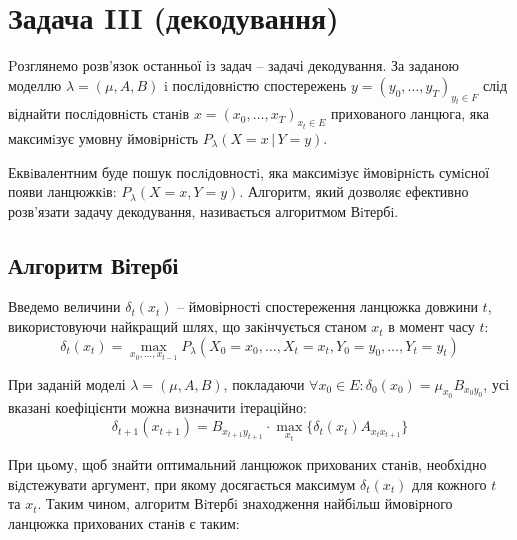 \section{Задача III (декодування)}

Pозглянемо розв'язок останньої із задач -- задачі декодування. За заданою моделлю $\lambda=(\mu,A,B)$ i послiдовнiстю спостережень $y=(y_0, \ldots , y_T)_{y_t\in F}$ слід віднайти послiдовнiсть станiв $x=(x_0, \ldots , x_T)_{x_t\in E}$ прихованого ланцюга, яка максимiзує умовну ймовiрнiсть $P_\lambda(X=x \, |\, Y=y)$.

Еквiвалентним буде пошук послiдовностi, яка максимiзує ймовiрнiсть сумiсної появи ланцюжкiв: $P_\lambda(X=x,Y=y)$. Алгоритм, який дозволяє ефективно розв’я\-зати задачу декодування, називається алгоритмом
Вiтербi.

\subsection{Алгоритм Вітербі}

Введемо величини $\delta_t(x_t)$ -- ймовірності спостереження ланцюжка довжини $t$, використовуючи найкращий шлях, що закiнчується станом $x_t$ в момент часу $t:$
\[ \delta_t(x_t)=\max_{x_0,\ldots,x_{t-1}}P_\lambda(X_0=x_0,\ldots,X_t=x_t,Y_0=y_0,\ldots,Y_t=y_t) \]

При заданій моделі $\lambda=(\mu,A,B)$, покладаючи $\forall x_0\in E: \delta_0(x_0)=\mu_{x_0}B_{x_0y_0}$, усі вказані коефіцієнти можна визначити ітераційно: 
\[ \delta_{t+1}(x_{t+1})=B_{x_{t+1}y_{t+1}}\cdot\max_{x_t}\{\delta_t(x_t)A_{x_tx_{t+1}}\} \]

При цьому, щоб знайти оптимальний ланцюжок прихованих станiв, необхідно вiдстежувати аргумент, при якому досягається максимум $\delta_t(x_t)$ для кожного $t$ та $x_t$. Таким чином, алгоритм Вiтербi знаходження найбiльш ймовiрного ланцюжка прихованих станiв є таким:

